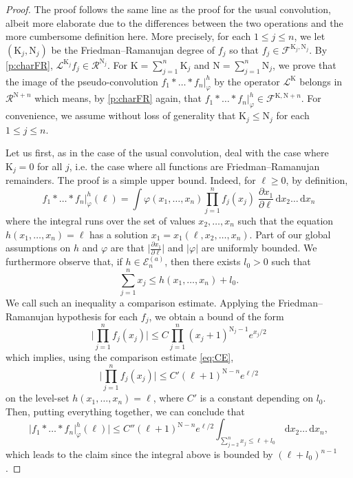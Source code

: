 \documentclass[12pt,twoside]{article}
\theoremstyle{theorem}
\theoremstyle{remark}
\theoremstyle{definition}
\theoremstyle{example}
\renewcommand{\d}{\, \mathrm{d}}
\newcommand{\1}[1]{\mathds{1}_{#1}}
\newcommand{\cR}{\mathcal{R}}
\newcommand{\cF}{\mathcal{F}}
\newcommand{\cL}{\mathcal{L}}
\newcommand{\rK}{\mathrm{K}}
\newcommand{\rN}{\mathrm{N}}
\newcommand{\cE}{\mathcal{E}}
\begin{document}
 \begin{proof}
   The proof follows the same line as the proof for the usual convolution, albeit more elaborate due
   to the differences between the two operations and the more cumbersome definition here.
   More precisely, for each $1 \leq j \leq n$, we let $(\rK_j,\rN_j)$ be the Friedman--Ramanujan
   degree of $f_j$ so that $f_j \in \cF^{\rK_j,\rN_j}$. By \cref{p:charFR},
   $\cL^{\rK_j} f_j \in \cR^{\rN_j}$. For $\rK=\sum_{j=1}^n\rK_j$ and $\rN = \sum_{j=1}^n \rN_j$, we
   prove that the image of the pseudo-convolution $f_1 \ast \ldots \ast f_n|_\varphi^h$ by the
   operator $\cL^\rK$ belongs in $\cR^{\rN+n}$ which means, by \cref{p:charFR} again, that
   $f_1 \ast \ldots \ast f_n|_\varphi^h \in \cF^{\rK,\rN+n}$. For convenience, we assume without
   loss of generality that $\rK_j \leq \rN_j$ for each $1 \leq j \leq n$.

   Let us first, as in the case of the usual convolution, deal with the case where $\rK_j=0$ for all
   $j$, i.e. the case where all functions are Friedman--Ramanujan remainders. The proof is a simple
   upper bound.     Indeed, for $\ell \geq 0$, by definition,
   \begin{equation}
     \label{eq:upb_FR_conv}
      f_1 \ast \ldots \ast f_n|_\varphi^h(\ell)
     = \int \varphi(x_1, \ldots, x_n)
     \prod_{j=1}^n f_j(x_j) \;\frac{\partial x_1}{\partial \ell}
     \d x_2 \ldots \d x_n
  \end{equation}
  where the integral runs over the set of values $x_2, \ldots, x_n$ such that the equation
  $h(x_1, \ldots, x_n) = \ell$ has a solution $x_1 = x_1(\ell,x_2, \ldots, x_n)$.  Part of our global
  assumptions on $h$ and $\varphi$ are that $\big|\frac{\partial x_1}{\partial \ell}\big|$ and
  $|\varphi|$ are uniformly bounded.  We furthermore observe that, if $h \in \cE_n^{(a)}$, then
  there exists $l_0>0$ such that
  \begin{equation}
    \label{eq:CE}
     \sum_{j=1}^n x_j \leq h(x_1, \ldots, x_n) + l_0.
   \end{equation}
   We call such an inequality a comparison estimate.
   Applying the Friedman--Ramanujan hypothesis for each $f_j$, we obtain a bound of the form
   \begin{equation}
     \label{eq:appl_FR_0}
     \Big|\prod_{j=1}^n f_j(x_j)\big|
     \leq C \prod_{j=1}^n (x_j+1)^{\rN_j-1} e^{x_j/2}
   \end{equation}
   which implies, using the comparison estimate \eqref{eq:CE},
   \begin{equation}
     \Big|\prod_{j=1}^n f_j(x_j)\big|
     \leq C' (\ell+1)^{\rN-n} e^{\ell/2}
   \end{equation}
   on the level-set $h(x_1, \ldots, x_n)=\ell$, where $C'$ is a constant depending on $l_0$. Then,
   putting everything together, we can conclude that
   \begin{equation}
     \label{eq:upb_FR_conv2}
    \big| f_1 \ast \ldots \ast f_n|_\varphi^h(\ell)\big|
    \leq C'' (\ell+1)^{\rN-n} e^{\ell/2} \int_{\sum_{j=2}^n x_j \leq \ell + l_0} \d x_2 \ldots \d x_n,
  \end{equation}
  which leads to the claim since the integral above is bounded by $(\ell+l_0)^{n-1}$.
   

\end{proof}
\end{document}
